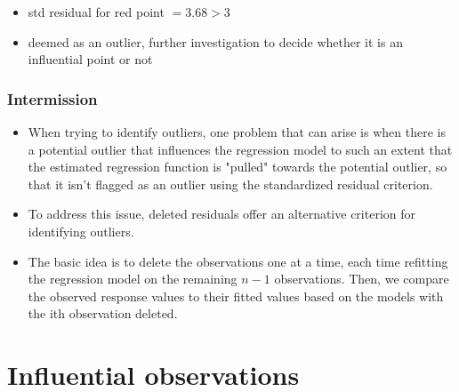 \documentclass[
	11pt, %
]{beamer}
\begin{document}
\begin{frame}[allowframebreaks]
\begin{figure}
	\end{figure} 
	\begin{itemize}
		\item std residual for red point $=3.68 > 3$
		\item deemed as an outlier, further investigation to decide whether it is an influential point or not
	\end{itemize}
\end{frame}

\begin{frame}
	\frametitle{Intermission}
	\begin{itemize}
		\item When trying to identify outliers, one problem that can arise is when there is a potential outlier that influences the
		regression model to such an extent that the estimated regression function is "pulled" towards the potential outlier, so that it
		isn't flagged as an outlier using the standardized residual criterion.
		\item To address this issue, deleted residuals offer an alternative criterion for identifying outliers.
		\item The basic idea is to delete the observations one at a time, each time refitting the
		regression model on the remaining $n-1$ observations. Then, we compare the observed response values to their fitted values
		based on the models with the ith observation deleted.
	\end{itemize}
\end{frame}

\section{Influential observations}
\end{document}
